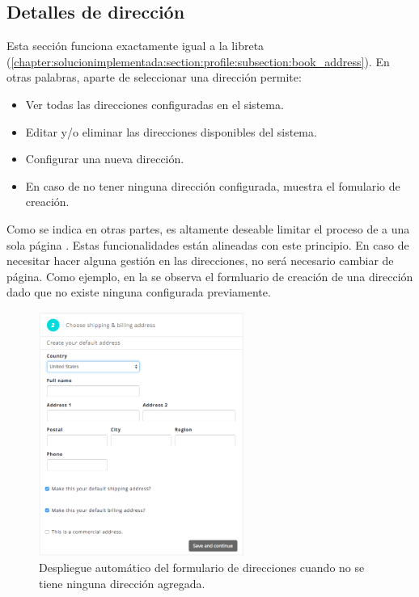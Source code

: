 \subsection{Detalles de dirección}\label{chapter:solucionimplementada:section:address}

	Esta sección funciona exactamente igual a la libreta  (\ref{chapter:solucionimplementada:section:profile:subsection:book_address}). En otras palabras, aparte de seleccionar una dirección permite:

	\begin{itemize}
		\item Ver todas las direcciones configuradas en el sistema.
		\item Editar y/o eliminar las direcciones disponibles del sistema.
		\item Configurar una nueva dirección.
		\item En caso de no tener ninguna dirección configurada, muestra el fomulario de creación.
	\end{itemize}

	Como se indica en otras partes, es altamente deseable limitar el proceso de \checkoutCOM a una sola página \cite{online_official_imediaconnection_best_practices_shopping_cart}. Estas funcionalidades están alineadas con este principio. En caso de necesitar hacer alguna gestión en las direcciones, no será necesario cambiar de página.
	Como ejemplo, en la  se observa el formluario de creación de una dirección dado que no existe ninguna configurada previamente.

	\begin{figure}[H]
		\centering
		\includegraphics[width=0.6\textwidth]{figuras/shipping/form_address.png}
		\caption{Despliegue automático del formulario de direcciones cuando no se tiene ninguna dirección agregada.}
		\label{figure:checkout:form_address_default}
	\end{figure}